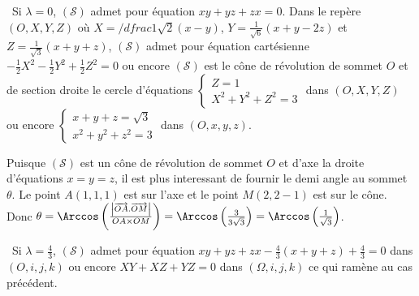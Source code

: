 {{\textbullet~Si $\lambda=0$, $(\mathcal{S})$ admet pour équation $xy+yz+zx = 0$.
Dans le repère $(O,X,Y,Z)$ où $X=/dfrac{1}{\sqrt{2}}(x-y)$, $Y = \frac{1}{\sqrt{6}}(x+y-2z)$ et $Z = \frac{1}{\sqrt{3}}(x+y+z)$, $(\mathcal{S})$ admet pour équation cartésienne $- \frac{1}{2}X^2-  \frac{1}{2}Y^2+ \frac{1}{2}Z^2 = 0$ ou encore $(\mathcal{S})$ est le cône de révolution de sommet 
$O$ et de section droite le cercle d'équations $\left\{
\begin{array}{l}
Z=1\\
X^2+Y^2+Z^2=3
\end{array}
\right.$ dans $(O,X,Y,Z)$ ou encore $\left\{
\begin{array}{l}
x+y+z=\sqrt{3}\\
x^2+y^2+z^2=3
\end{array}
\right.$ dans $(O,x,y,z)$.

Puisque $(\mathcal{S})$ est un cône de révolution de sommet $O$ et d'axe la droite d'équations $x=y=z$, il est plus interessant de fournir le demi angle au sommet $\theta$. Le point $A(1,1,1)$ est sur l'axe et le point $M(2,2-1)$ est sur le cône. Donc $\theta=\Arccos\left( \frac{\left|\overrightarrow{OA}.\overrightarrow{OM}\right|}{OA\times OM}\right)=\Arccos\left( \frac{3}{3\sqrt{3}}\right)=\Arccos\left( \frac{1}{\sqrt{3}}\right)$. 

\textbullet~Si $\lambda= \frac{4}{3}$, $(\mathcal{S})$ admet pour équation $xy+yz+zx- \frac{4}{3}(x+y+z) + \frac{4}{3}= 0$ dans $(O,i,j,k)$  ou encore 
$XY+XZ+YZ = 0$ dans $(\Omega,i,j,k)$ ce qui ramène au cas précédent.}
}
